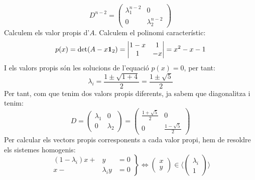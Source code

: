 \[
D^{n-2}=\begin{pmatrix}
\lambda_1^{n-2} & 0 \\ 0 & \lambda_2^{n-2}
\end{pmatrix}
\]
Calculem els valor propis d'$A$. Calculem el polinomi característic:
\[
p(x)=\det(A-x\mathbf{1}_2)=\begin{vmatrix}
1-x & 1 \\ 1 & -x
\end{vmatrix}= x^2-x-1
\]
I els valors propis són les solucions de l'equació $p(x)=0$, per tant:
\[
\lambda_i=\frac{1\pm \sqrt{1+4}}{2}=\frac{1\pm\sqrt{5}}{2}
\]
Per tant, com que tenim dos valors propis diferents, ja sabem que diagonalitza i tenim:
\[
D=
\begin{pmatrix} \lambda_1 & 0 \\ 0  & \lambda_2
\end{pmatrix}=
\begin{pmatrix}
\frac{1+\sqrt{5}}{2} & 0 \\ 0 & \frac{1-\sqrt{5}}{2}
\end{pmatrix}
\]
Per calcular els vectors propis corresponents a cada valor propi, hem de resoldre els sistemes homogenis:
\[
\left.
\begin{array}{rrr}
    (1-\lambda_i) x + & y & =0 \\ x  - & \lambda_i y  &= 0
\end{array} \right\} \Longleftrightarrow \begin{pmatrix}
x \\ y 
\end{pmatrix} \in \langle \begin{pmatrix}
\lambda_i \\ 1
\end{pmatrix} \rangle
\]
